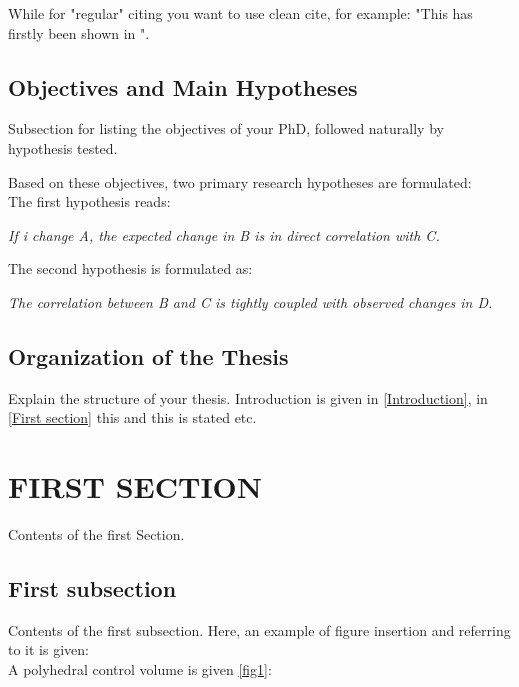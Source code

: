 \documentclass[12pt,a4paper]{article}
\begin{document}
While for "regular" citing you want to use clean cite, for example: "This has firstly been shown in \cite{patankar1980numerical}".\\
  
 
\subsection{Objectives and Main Hypotheses}\label{Objectives and main hypothesis}
Subsection for listing the objectives of your PhD, followed naturally by hypothesis tested.

 Based on these objectives, two primary research hypotheses are formulated:\\
The first hypothesis reads:\\
\begin{center}
	\textit{If i change A, the expected change in B is in direct correlation with C.}
\end{center}

The second hypothesis is formulated as:\\
\begin{center}
	\textit{The correlation between B and C is tightly coupled with observed changes in D.}
\end{center}

\newpage


\subsection{Organization of the Thesis} \label{Organization of the thesis}
Explain the structure of your thesis. Introduction is given in \autoref{Introduction}, in \autoref{First section} this and this is stated etc.
 
\newpage

\section[First Section]{FIRST SECTION}\label{First section}

Contents of the first Section.

\subsection{First subsection}\label{First subsection}
Contents of the first subsection. Here, an example of figure insertion and referring to it is given:\\

A polyhedral control volume is given \autoref{fig1}: 
\end{document}
